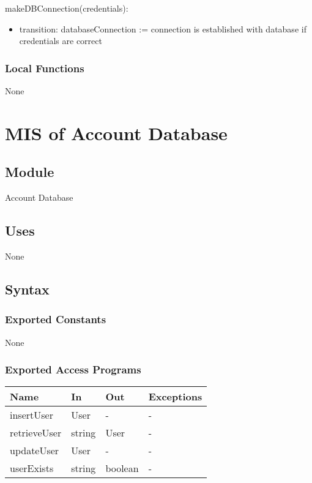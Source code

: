 \documentclass[12pt, titlepage]{article}
\begin{document}
\noindent makeDBConnection(credentials):
\begin{itemize}
\item transition: databaseConnection := connection is established with database if credentials are correct
\end{itemize}


\subsubsection{Local Functions}
None

\section{MIS of Account Database} \label{accd}

\subsection{Module}

Account Database

\subsection{Uses}

None

\subsection{Syntax}

\subsubsection{Exported Constants}
None
\subsubsection{Exported Access Programs}

\begin{center}
\begin{tabular}{p{2cm} p{4cm} p{4cm} p{2cm}}
\hline
\textbf{Name} & \textbf{In} & \textbf{Out} & \textbf{Exceptions} \\
\hline
insertUser & User & - & - \\
retrieveUser & string & User & - \\
updateUser & User & - & - \\
userExists & string & boolean & - \\
\hline
\end{tabular}
\end{center}
\end{document}
